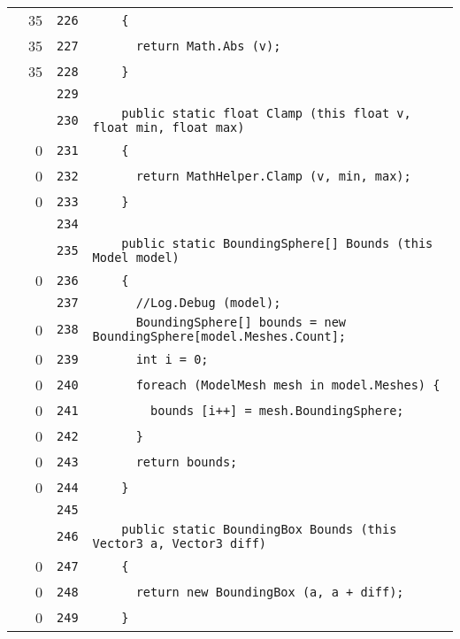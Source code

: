 \documentclass[a4paper,10pt]{article}
\begin{document}
\begin{longtable}[l]{lrrl}
\cellcolor{green} & 35 & \verb~226~ & \verb~    {~\\
\cellcolor{green} & 35 & \verb~227~ & \verb~      return Math.Abs (v);~\\
\cellcolor{green} & 35 & \verb~228~ & \verb~    }~\\
\cellcolor{gray} &  & \verb~229~ & \verb~~\\
\cellcolor{gray} &  & \verb~230~ & \verb~    public static float Clamp (this float v, float min, float max)~\\
\cellcolor{red} & 0 & \verb~231~ & \verb~    {~\\
\cellcolor{red} & 0 & \verb~232~ & \verb~      return MathHelper.Clamp (v, min, max);~\\
\cellcolor{red} & 0 & \verb~233~ & \verb~    }~\\
\cellcolor{gray} &  & \verb~234~ & \verb~~\\
\cellcolor{gray} &  & \verb~235~ & \verb~    public static BoundingSphere[] Bounds (this Model model)~\\
\cellcolor{red} & 0 & \verb~236~ & \verb~    {~\\
\cellcolor{gray} &  & \verb~237~ & \verb~      //Log.Debug (model);~\\
\cellcolor{red} & 0 & \verb~238~ & \verb~      BoundingSphere[] bounds = new BoundingSphere[model.Meshes.Count];~\\
\cellcolor{red} & 0 & \verb~239~ & \verb~      int i = 0;~\\
\cellcolor{red} & 0 & \verb~240~ & \verb~      foreach (ModelMesh mesh in model.Meshes) {~\\
\cellcolor{red} & 0 & \verb~241~ & \verb~        bounds [i++] = mesh.BoundingSphere;~\\
\cellcolor{red} & 0 & \verb~242~ & \verb~      }~\\
\cellcolor{red} & 0 & \verb~243~ & \verb~      return bounds;~\\
\cellcolor{red} & 0 & \verb~244~ & \verb~    }~\\
\cellcolor{gray} &  & \verb~245~ & \verb~~\\
\cellcolor{gray} &  & \verb~246~ & \verb~    public static BoundingBox Bounds (this Vector3 a, Vector3 diff)~\\
\cellcolor{red} & 0 & \verb~247~ & \verb~    {~\\
\cellcolor{red} & 0 & \verb~248~ & \verb~      return new BoundingBox (a, a + diff);~\\
\cellcolor{red} & 0 & \verb~249~ & \verb~    }~\\

\end{longtable}
\end{document}
